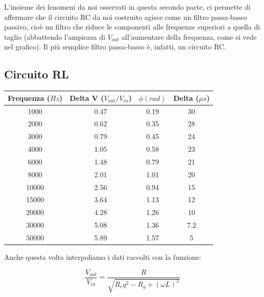 L'insieme dei fenomeni da noi osservati in questa secondo parte, ci permette di affermare che il circuito RC da noi costruito agisce come un filtro passa-basso passivo, cioè un filtro che riduce le componenti alle frequenze superiori a quella di taglio (abbattendo l'ampiezza di $V_{out}$ all'aumentare della frequenza, come si vede nel grafico). Il più semplice filtro passa-basso è, infatti, un circuito RC. 

\subsection*{Circuito RL}
\begin{center}

\begin{tabular}{*{4}{c}}
Frequenza ($Hz$) & Delta V ($V_{out}/V_{in}$) & $\phi (rad)$ & Delta ($\mu s$) \\
\midrule
1000& 0.47 & 0.19 & 30 \\
2000 & 0.62 & 0.35 & 28\\
3000 & 0.79 & 0.45 & 24\\
4000 & 1.05 & 0.58 & 23\\
6000 & 1.48 & 0.79 & 21\\
8000 & 2.01 & 1.01 & 20\\
10000 & 2.56 & 0.94 & 15\\
15000 & 3.64 & 1.13 & 12\\
20000 & 4.28 & 1.26 & 10 \\
30000 & 5.08 & 1.36 & 7.2\\
50000 & 5.89 & 1.57 & 5\\
\end{tabular}
\end{center}



Anche questa volta interpoliamo i dati raccolti con la funzione:

$$\frac{V_{out}}{V_{in}} = \frac{R}{\sqrt{R_eq^2 -R_g + (\omega L)^2}}$$


